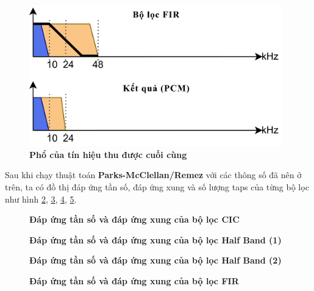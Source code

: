\begin{figure}[H]
    \centering
    \includegraphics[width=11cm]{Images/Chuong3/4.png}
    \caption[Phổ của tín hiệu thu được cuối cùng]{\bfseries \fontsize{12pt}{0pt}\selectfont Phổ của tín hiệu thu được cuối cùng}
    \label{t4}
\end{figure}

Sau khi chạy thuật toán \textbf{Parks-McClellan/Remez} với các thông số đã nên ở trên, ta có đồ thị đáp ứng tần số, đáp ứng xung và số lượng taps của từng bộ lọc như hình \ref{a}, \ref{b}, \ref{c}, \ref{d}.  

\begin{figure}[H]
    \centering
    
    \caption[Đáp ứng tần số và đáp ứng xung của bộ lọc CIC]{\bfseries \fontsize{12pt}{0pt}\selectfont Đáp ứng tần số và đáp ứng xung của bộ lọc CIC}
    \label{a}
\end{figure}

\begin{figure}[H]
    \centering
    
    \caption[Đáp ứng tần số và đáp ứng xung của bộ lọc Half Band (1)]{\bfseries \fontsize{12pt}{0pt}\selectfont Đáp ứng tần số và đáp ứng xung của bộ lọc Half Band (1)}
    \label{b}
\end{figure}
\begin{figure}[H]
    \centering
    
    \caption[Đáp ứng tần số và đáp ứng xung của bộ lọc Half Band (2)]{\bfseries \fontsize{12pt}{0pt}\selectfont Đáp ứng tần số và đáp ứng xung của bộ lọc Half Band (2)}
    \label{c}
\end{figure}
\begin{figure}[H]
    \centering
    
    \caption[Đáp ứng tần số và đáp ứng xung của bộ lọc FIR]{\bfseries \fontsize{12pt}{0pt}\selectfont Đáp ứng tần số và đáp ứng xung của bộ lọc FIR}
    \label{d}
\end{figure}
